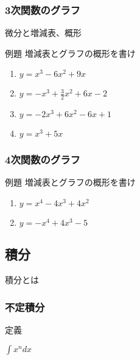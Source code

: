\documentclass[10pt,dvipdfmx]{jsarticle}
\begin{document}
\subsubsection*{3次関数のグラフ}
\begin{itembox}[l]{微分と増減表、概形}
  \vspace{10mm}
\end{itembox}

\begin{itembox}[l]{例題}
  増減表とグラフの概形を書け
  \begin{large}
    \begin{enumerate}
      \item $y=x^3-6x^2+9x$\vspace{15mm}
      \item $y=-x^3+\frac{3}{2}x^2+6x-2$\vspace{15mm}
      \item $y=-2x^3+6x^2-6x+1$\vspace{15mm}
      \item $y=x^3+5x$\vspace{15mm}
    \end{enumerate}
  \end{large}
\end{itembox}

\subsubsection*{4次関数のグラフ}
\begin{itembox}[l]{例題}
  増減表とグラフの概形を書け
  \begin{large}
    \begin{enumerate}
      \item $y=x^4-4x^3+4x^2$\vspace{15mm}
      \item $y=-x^4+4x^3-5$\vspace{15mm}
    \end{enumerate}
  \end{large}
\end{itembox}


\newpage
\subsection*{積分}
\begin{itembox}[l]{積分とは}
  \vspace{10mm}
\end{itembox}
\subsubsection*{不定積分}
定義
\begin{LARGE}
  $\int x^ndx$
\end{LARGE}
\vspace{8mm}
\end{document}
